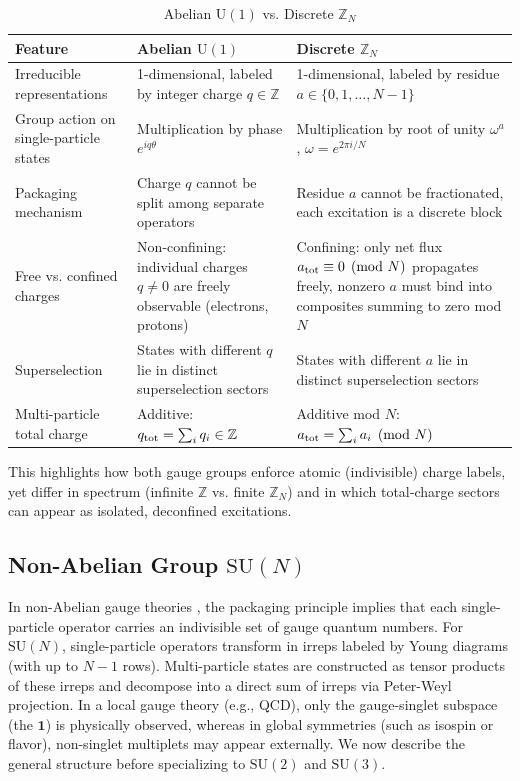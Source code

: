 \documentclass[12pt,a4paper]{article}
\begin{document}
\begin{table}[!h]
	\centering
	\caption{Abelian $\mathrm{U}(1)$ vs. Discrete $\mathbb{Z}_N$}
	\label{TAB:U1VsZN}
	\begin{tabular}{p{4cm}|p{5cm}|p{6cm}}
		\toprule
		Feature  & Abelian $\mathrm{U}(1)$ & Discrete $\mathbb{Z}_N$ \\
		\midrule
		Irreducible representations & 1-dimensional, labeled by integer charge $q\in\mathbb{Z}$ & 1-dimensional, labeled by residue $a\in\{0,1,\dots,N-1\}$ \\
		\hline
		Group action on single-particle states & Multiplication by phase $e^{i q\theta}$ & Multiplication by root of unity $\omega^a$, $\omega=e^{2\pi i/N}$ \\
		\hline
		Packaging mechanism & Charge $q$ cannot be split among separate operators & Residue $a$ cannot be fractionated, each excitation is a discrete block \\
		\hline
		Free vs. confined charges & Non-confining: individual charges $q\neq0$ are freely observable (electrons, protons) & Confining: only net flux $a_{\rm tot}\equiv0\pmod N$ propagates freely, nonzero $a$ must bind into composites summing to zero mod $N$ \\
		\hline
		Superselection & States with different $q$ lie in distinct superselection sectors & States with different $a$ lie in distinct superselection sectors \\
		\hline
		Multi-particle total charge & Additive: $q_{\rm tot}=\sum_i q_i\in\mathbb Z$ & Additive mod $N$: $a_{\rm tot}=\sum_i a_i\pmod N$  \\
		\bottomrule
	\end{tabular}
\end{table}


This highlights how both gauge groups enforce atomic (indivisible) charge labels, yet differ in spectrum (infinite $\mathbb Z$ vs. finite $\mathbb Z_N$) and in which total‐charge sectors can appear as isolated, deconfined excitations.



\subsection{Non-Abelian Group $\mathrm{SU}(N)$}

In non-Abelian gauge theories \cite{Utiyama1956,Cartan1913,Hooft1978}, the packaging principle implies that each single-particle operator carries an indivisible set of gauge quantum numbers.
For $ \mathrm{SU}(N) $, single-particle operators transform in irreps labeled by Young diagrams (with up to $N-1$ rows).
Multi-particle states are constructed as tensor products of these irreps and decompose into a direct sum of irreps via Peter-Weyl projection.
In a local gauge theory (e.g., QCD), only the gauge-singlet subspace (the $\mathbf{1}$) is physically observed, whereas in global symmetries (such as isospin or flavor), non-singlet multiplets may appear externally.
We now describe the general structure before specializing to $\mathrm{SU}(2)$ and $\mathrm{SU}(3)$.
\end{document}

